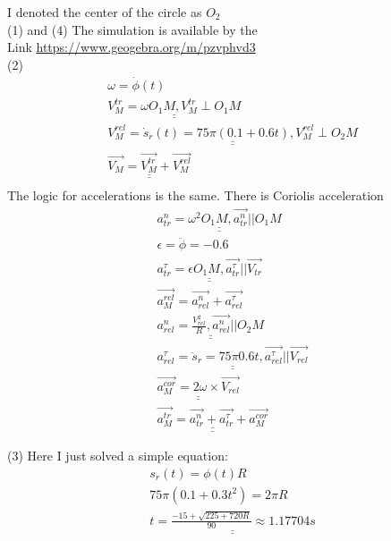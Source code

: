 \documentclass[a4paper,11pt,oneside,article]{memoir}
\def\doubleunderline#1{\underline{\underline{#1}}}
\begin{document}
I denoted the center of the circle as $O_2$\\
(1) and (4)  The simulation is available by the\\ Link
\url{https://www.geogebra.org/m/pzvphvd3}\\
(2) \begin{equation}
\begin{split}
    \omega = \dot \phi(t)\\
    \doubleunderline{
    V_M ^{tr} = \omega O_1M, V_M ^{tr} \perp O_1M
    }\\
    \doubleunderline{
    V_M ^{rel} = \dot s_r(t) = 75\pi (0.1+0.6t), V_M ^{rel} \perp O_2M
    }\\
        \doubleunderline{
    \overrightarrow{V_M} = \overrightarrow{V_M ^{tr}} + \overrightarrow{V_M ^{rel}}
    }\\
\end{split}
\end{equation}
The logic for accelerations is the same. There is Coriolis acceleration\\
\begin{equation}
\begin{split}
    \doubleunderline{
    a_{tr} ^{n} = \omega ^2 O_1M,  \overrightarrow{a_{tr} ^{n}} || O_1M
    }\\
    \epsilon = \ddot \phi = -0.6
    \\
    \doubleunderline{
    a_{tr} ^{\tau} = \epsilon O_1M, \overrightarrow{a_{tr} ^{\tau}} || \overrightarrow{V_{tr}}
    }\\
    \overrightarrow{a_M ^{rel}} =\overrightarrow{a_{rel} ^{n}} + \overrightarrow{a_{rel} ^{\tau}}\\
    \doubleunderline{
    a_{rel} ^{n} = \frac{V_{rel}^2}{R},  \overrightarrow{a_{rel} ^{n}} || O_2M
    }\\
    \doubleunderline{
    a_{rel} ^{\tau} = \ddot s_r = 75\pi 0.6t, \overrightarrow{a_{rel} ^{\tau}} || \overrightarrow{V_{rel}}
    }\\
    \doubleunderline{
    \overrightarrow{a_M ^{cor}} = 2 \omega \times  \overrightarrow{V_{rel}}
    }
    \\
    \doubleunderline{
     \overrightarrow{a_M ^{tr}} =\overrightarrow{a_{tr} ^{n}} + \overrightarrow{a_{tr} ^{\tau}} + \overrightarrow{a_{M} ^{cor}}
     }
\end{split}
\end{equation}

(3) Here I just solved a simple equation:
\begin{equation}
\begin{split}
    s_r (t) = \phi (t) R\\
    75 \pi (0.1 + 0.3t^2) = 2\pi R\\
    \doubleunderline{
    t = \frac{-15+\sqrt{225+720R}}{90} \approx 1.17704 s
    }
\end{split}
\end{equation}
\end{document}

